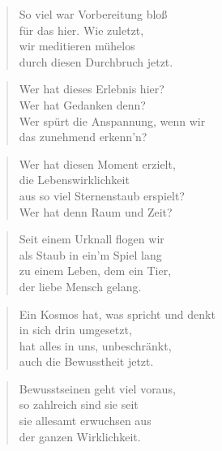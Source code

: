 \documentclass[10pt,a4paper]{article}
\begin{document}
\begin{paracol}{2}
\begin{verse}
So viel war Vorbereitung bloß \\
für das hier. Wie zuletzt, \\
wir meditieren mühelos \\
durch diesen Durchbruch jetzt. \\
\end{verse}

\begin{verse}
Wer hat dieses Erlebnis hier? \\
Wer hat Gedanken denn? \\
Wer spürt die Anspannung, wenn wir \\
das zunehmend erkenn’n? \\
\end{verse}

\begin{verse}
Wer hat diesen Moment erzielt, \\
die Lebenswirklichkeit \\
aus so viel Sternenstaub erspielt? \\
Wer hat denn Raum und Zeit? \\
\end{verse}

\begin{verse}
Seit einem Urknall flogen wir \\
als Staub in ein’m Spiel lang \\
zu einem Leben, dem ein Tier, \\
der liebe Mensch gelang. \\
\end{verse}

\begin{verse}
Ein Kosmos hat, was spricht und denkt \\
in sich drin umgesetzt, \\
hat alles in uns, unbeschränkt, \\
auch die Bewusstheit jetzt. \\
\end{verse}

\begin{verse}
Bewusstseinen geht viel voraus, \\
so zahlreich sind sie seit \\
sie allesamt erwuchsen aus \\
der ganzen Wirklichkeit. \\
\end{verse}


\end{paracol}
\end{document}
